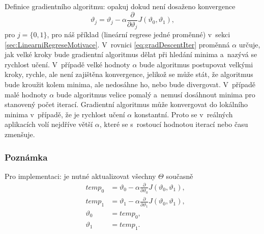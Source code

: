 \par{Definice gradientního algoritmu: opakuj dokud není dosaženo konvergence
\begin{equation}
	\vartheta_j = \vartheta_j - \alpha \frac{\partial}{\partial \vartheta_j} J \left( \vartheta_0 , \vartheta_1 \right),
	\label{eq:gradDescentIter}
\end{equation}
pro $j = \{ 0, 1 \}$, pro náš příklad (lineární regrese jedné proměnné) v~sekci \ref{sec:LinearniRegreseMotivace}. V~rovnici \ref{eq:gradDescentIter} proměnná $\alpha$ určuje, jak velké kroky bude gradientní algoritmus dělat při hledání minima a~nazývá se rychlost učení. V~případě velké hodnoty $\alpha$ bude algoritmus postupovat velkými kroky, rychle, ale není zajištěna konvergence, jelikož se může stát, že algoritmus bude kroužit kolem minima, ale nedosáhne ho, nebo bude divergovat. V~případě malé hodnoty $\alpha$ bude algoritmus velice pomalý a~nemusí dosáhnout minima pro stanovený počet iterací. Gradientní algoritmus může konvergovat do lokálního minima v~případě, že je rychlost učení $\alpha$ konstantní. Proto se v~reálných aplikacích volí nejdříve větší $\alpha$, které se s~rostoucí hodnotou iterací nebo času zmenšuje.}

\subsubsection*{Poznámka}
\par{Pro implementaci: je nutné aktualizovat všechny $\Theta$ současně
\begin{eqnarray}
	&temp_0 &= \vartheta_0 - \alpha \frac{\partial}{\partial \vartheta_0} J \left( \vartheta_0 , \vartheta_1 \right),\\
	&temp_1 &= \vartheta_1 - \alpha \frac{\partial}{\partial \vartheta_1} J \left( \vartheta_0 , \vartheta_1 \right), \\
		&\vartheta_0 &= temp_0, \\
		&\vartheta_1 &= temp_1.
\end{eqnarray}}

